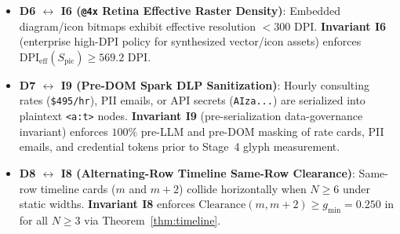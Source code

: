 \documentclass[10pt,journal,compsoc]{IEEEtran}
\begin{document}
\begin{itemize}
    \item \textbf{D6 $\leftrightarrow$ I6 (\texttt{@4x} Retina Effective Raster Density)}: Embedded diagram/icon bitmaps exhibit effective resolution $< 300\text{ DPI}$. \textbf{Invariant I6} (enterprise high-DPI policy for synthesized vector/icon assets) enforces $\text{DPI}_{\text{eff}}(S_{\text{pic}}) \ge 569.2\text{ DPI}$.
    \item \textbf{D7 $\leftrightarrow$ I9 (Pre-DOM Spark DLP Sanitization)}: Hourly consulting rates (\texttt{\$495/hr}), PII emails, or API secrets (\texttt{AIza...}) are serialized into plaintext \texttt{<a:t>} nodes. \textbf{Invariant I9} (pre-serialization data-governance invariant) enforces $100\%$ pre-LLM and pre-DOM masking of rate cards, PII emails, and credential tokens prior to Stage~4 glyph measurement.
    \item \textbf{D8 $\leftrightarrow$ I8 (Alternating-Row Timeline Same-Row Clearance)}: Same-row timeline cards ($m$ and $m+2$) collide horizontally when $N \ge 6$ under static widths. \textbf{Invariant I8} enforces $\text{Clearance}(m, m+2) \ge g_{\min} = 0.250\text{ in}$ for all $N \ge 3$ via Theorem~\ref{thm:timeline}.
\end{itemize}
\end{document}
